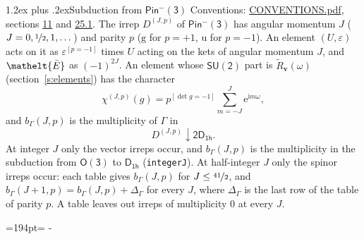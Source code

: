 \documentclass[10pt,a4paper]{article}
\makeatletter
\renewcommand\section{\@startsection{section}{1}{\z@}{-3ex plus -1ex minus -.2ex}%
  {1.2ex plus .2ex}{\normalfont\large\sffamily\bfseries\color{parttitle}}}
\newcommand{\needspace}[1]{\par\penalty-100\begingroup\dimen0=#1\relax\dimen2=\pagegoal
  \advance\dimen2-\pagetotal\ifdim\dimen0>\dimen2\relax\ifdim\dimen2>0pt\vfil\break\fi\fi
  \endgroup}
\numberwithin{equation}{section}
\newcommand{\eltfont}[1]{{\let\sigma\eltsigma\mathelt{#1}}}
\newcommand{\grp}[1]{\mathsf{#1}}
\newcommand{\elt}[1]{\eltfont{#1}}
\newcommand{\ptag}[1]{\mathrm{#1}}
\newcommand{\iverson}[1]{[#1]}
\newcommand{\restr}[2]{#1\!\downarrow#2}
\newcommand{\vv}{\mathbf{v}}
\newcommand{\iunit}{\mathrm{i}}
\newcommand{\expe}{\mathrm{e}}
\newcommand{\irrJp}[2]{D^{(#1,#2)}}
\newcommand{\barred}[1]{\bar{#1}}
\newcommand{\lift}[1]{\tilde{#1}}
\makeatother
\begin{document}
\section{Subduction from \texorpdfstring{$\grp{Pin^{-}(3)}$}{Pin(3)}}\label{s:subduction_parent}
Conventions: \href{../../CONVENTIONS.pdf}{CONVENTIONS.pdf}, sections \href{../../../rotation/CONVENTIONS.pdf\#conv.11}{11} and \href{../../CONVENTIONS.pdf\#conv.25.1}{25.1}.
\leavevmode\label{n:index.J}\label{n:index.parity}\label{n:irrep.o3}The irrep $\irrJp{J}{p}$ of \href{Pinminus3.pdf}{$\grp{Pin^{-}(3)}$} has angular momentum $J$ ($J = 0, \nicefrac{1}{2}, 1, \dots$) and parity $p$ ($\ptag{g}$ for $p = +1$, $\ptag{u}$ for $p = -1$). An element $(U, \varepsilon)$ acts on it as $\varepsilon^{[p = -1]}$ times $U$ acting on the kets of angular momentum $J$, and $\elt{\barred{E}}$ as $(-1)^{2J}$. \label{n:function.character.parent}\label{n:function.multiplicity}An element whose $\grp{SU(2)}$ part is $\lift{R}_{\vv}(\omega)$ (section~\ref{s:elements}) has the character
\begin{equation}\label{e:chi}\chi^{(J,p)}(g) = p^{\iverson{\det g = -1}}\sum_{m=-J}^{J} \expe^{\iunit m\omega},\end{equation}
and $b_\Gamma(J, p)$ is the multiplicity of $\Gamma$ in
\begin{equation}\label{e:parent}\restr{\irrJp{J}{p}}{\grp{2D_{1h}}}.\end{equation}
At integer $J$ only the vector irreps occur, and $b_\Gamma(J, p)$ is the multiplicity in the subduction from $\grp{O(3)}$ to \href{../../../rotation/data/pdf/D1h.pdf}{$\grp{D_{1h}}$} (\texttt{integerJ}). \label{n:index.increment}At half-integer $J$ only the spinor irreps occur: each table gives $b_\Gamma(J, p)$ for $J \le \nicefrac{41}{2}$, and $b_\Gamma(J + 1, p) = b_\Gamma(J, p) + \Delta_\Gamma$ for every $J$, where $\Delta_\Gamma$ is the last row of the table of parity $p$. A table leaves out irreps of multiplicity 0 at every $J$.
\needspace{194pt}
\end{document}
